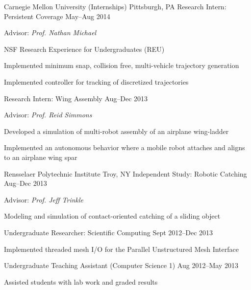 \begin{cventries}
  \cventrytwo
  {Carnegie Mellon University (Internships)}
  {Pittsburgh, PA}
  {Research Intern: Persistent Coverage}
  {May--Aug 2014}
  {
    \begin{cvitems}
    \item Advisor: \emph{Prof. Nathan Michael}
    \item NSF Research Experience for Undergraduates (REU)
    \item Implemented minimum snap, collision free, multi-vehicle trajectory
      generation
    \item Implemented controller for tracking of discretized trajectories
    \end{cvitems}
  }
  {Research Intern: Wing Assembly}
  {Aug--Dec 2013}
  {
    \begin{cvitems}
    \item Advisor: \emph{Prof. Reid Simmons}
    \item Developed a simulation of multi-robot assembly of an airplane wing-ladder
    \item Implemented an autonomous behavior where a mobile robot attaches and
      aligns to an airplane wing spar
    \end{cvitems}
  }

  \cventrytwo
  {Rensselaer Polytechnic Institute}
  {Troy, NY}
  {Independent Study: Robotic Catching}
  {Aug--Dec 2013}
  {
    \begin{cvitems}
    \item Advisor: \emph{Prof. Jeff Trinkle}
    \item Modeling and simulation of contact-oriented catching of a sliding object
    \end{cvitems}
  }
  {Undergraduate Researcher: Scientific Computing}
  {Sept 2012--Dec 2013}
  {
    \begin{cvitems}
    \item Implemented threaded mesh I/O for the Parallel Unstructured Mesh Interface
    \end{cvitems}
  }

  \cventry
  {}
  {}
  {Undergraduate Teaching Assistant (Computer Science 1)}
  {Aug 2012--May 2013}
  {
    \begin{cvitems}
    \item Assisted students with lab work and graded results
    \end{cvitems}
  }
\end{cventries}
